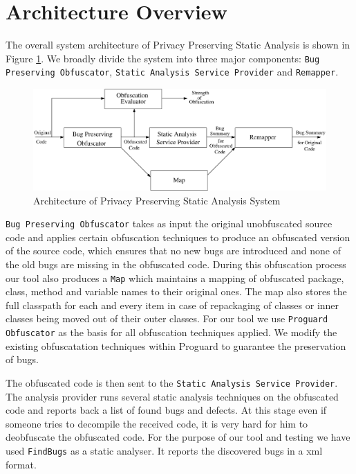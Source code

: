 \documentclass[conference]{IEEEtran}
\begin{document}
\section{Architecture Overview}
The overall system architecture of Privacy Preserving Static Analysis is shown in Figure \ref{fig:architecture}. We broadly divide the system into three major components: {\tt Bug 
Preserving Obfuscator}, {\tt Static Analysis Service Provider} and {\tt Remapper}.

\begin{figure}[h]
 \centering
 \includegraphics[scale=0.3]{./architecture1.eps}
 \caption{Architecture of Privacy Preserving Static Analysis System}
 \label{fig:architecture}
\end{figure}

{\tt Bug Preserving Obfuscator} takes as input the original unobfuscated source code and applies certain obfuscation techniques to produce an obfuscated version of the source code, which 
ensures that no new bugs are introduced and none of the old bugs are missing in the obfuscated code. During this obfuscation process our tool also produces a {\tt Map} which maintains a 
mapping of obfuscated package, class, method and variable names to their original ones. The map also stores the full classpath for each and every item in case of repackaging of classes 
or inner classes being moved out of their outer classes. For our tool we use {\tt Proguard Obfuscator} \cite{proguard} as the basis for all 
obfuscation techniques applied. We modify the existing obfuscatation techniques within Proguard to guarantee the preservation of bugs.

The obfuscated code is then sent to the {\tt Static Analysis Service Provider}. The analysis provider runs several static analysis techniques on the obfuscated code and reports back a 
list of found bugs and defects. At this stage even if someone tries to decompile the received code, it is very hard for him to deobfuscate the obfuscated code. For the purpose of our 
tool and testing we have used {\tt FindBugs} \cite{findbugs} as a static analyser. It reports the discovered bugs in a xml format.
\end{document}
